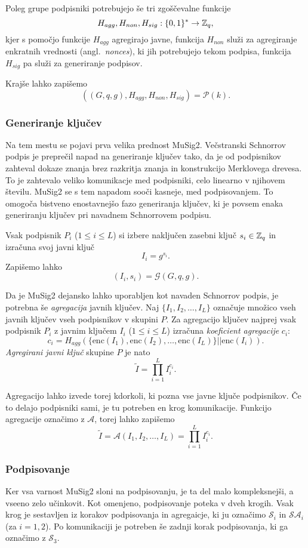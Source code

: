 Poleg grupe podpisniki potrebujejo še tri zgoščevalne funkcije
$$
H_{agg}, H_{non}, H_{sig}:\{0, 1\}^* \rightarrow \mathbb Z_q,
$$
kjer s pomočjo funkcije $H_{agg}$ agregirajo javne, funkcija $H_{non}$ služi za agregiranje enkratnih
vrednosti (angl.\ \textit{nonces}), ki jih potrebujejo tekom podpisa, funkcija $H_{sig}$ pa služi
za generiranje podpisov.

Krajše lahko zapišemo
$$
((G, q, g), H_{agg}, H_{non}, H_{sig}) = \mathcal{P}(k).
$$

\subsubsection{Generiranje ključev}
Na tem mestu se pojavi prva velika prednost MuSig2. Večstranski Schnorrov podpis je preprečil napad
na generiranje ključev tako, da je od podpisnikov zahteval dokaze znanja brez razkritja znanja in
konstrukcijo Merklovega drevesa. To je zahtevalo veliko komunikacje med podpisniki, celo linearno
v njihovem številu. MuSig2 se s tem napadom sooči kasneje, med podpisovanjem. To omogoča bistveno
enostavnejšo fazo generiranja ključev, ki je povsem enaka generiranju ključev pri navadnem
Schnorrovem podpisu.

Vsak podpisnik $P_i$ ($1 \le i \le L$) si izbere naključen zasebni ključ $s_i \in \mathbb Z_q$ in izračuna
svoj javni ključ
$$
I_i = g^{s_i}.
$$
Zapišemo lahko
$$
(I_i, s_i) = \mathcal{G}(G, q, g).
$$

Da je MuSig2 dejansko lahko uporabljen kot navaden Schnorrov podpis, je potrebna še \textit{agregacija}
javnih ključev. Naj $\{I_1, I_2, \dots, I_L\}$ označuje množico vseh javnih ključev vseh podpisnikov v
skupini $P$. Za agregacijo ključev najprej vsak podpisnik $P_i$ z javnim ključem $I_i$ ($1 \le i \le L$)
izračuna \textit{koeficient agregacije} $c_i$:
$$
c_i = H_{agg}(\{\text{enc}(I_1), \text{enc}(I_2), \dots, \text{enc}(I_L)\} || \text{enc}(I_i)).
$$
\textit{Agregirani javni ključ} skupine $P$ je nato
$$
\tilde{I} = \prod_{i=1}^L I_i^{c_i}.
$$

Agregacijo lahko izvede torej kdorkoli, ki pozna vse javne ključe podpisnikov. Če to delajo podpisniki
sami, je tu potreben en krog komunikacije. Funkcijo agregacije označimo z $\mathcal{A}$, torej
lahko zapišemo
$$
\tilde{I} = \mathcal{A}(I_1, I_2, \dots, I_L) = \prod_{i=1}^L I_i^{c_i}.
$$

\subsubsection{Podpisovanje}
Ker vsa varnost MuSig2 sloni na podpisovanju, je ta del malo kompleksnejši, a vseeno zelo učinkovit.
Kot omenjeno, podpisovanje poteka v dveh krogih. Vsak krog je sestavljen iz korakov podpisovanja
in agregaicje, ki ju označimo $\mathcal{S}_i$ in $\mathcal{S}\mathcal{A}_i$ (za $i = 1, 2$). Po
komunikaciji je potreben še zadnji korak podpisovanja, ki ga označimo z $\mathcal{S}_3$.

